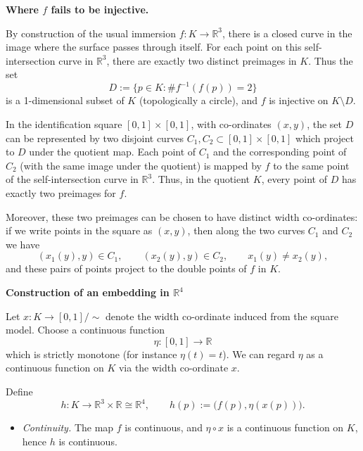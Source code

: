 \begin{solution}
\par\medskip\noindent\textbf{Where $f$ fails to be injective.}\par\smallskip

By construction of the usual immersion $f : K \to \mathbb{R}^3$, there is a
closed curve in the image where the surface passes through itself.  For each
point on this self-intersection curve in $\mathbb{R}^3$, there are exactly two
distinct preimages in $K$.  Thus the set
\[
D := \{ p \in K : \# f^{-1}(f(p)) = 2 \}
\]
is a 1-dimensional subset of $K$ (topologically a circle), and $f$ is injective
on $K \setminus D$.

In the identification square $[0,1]\times[0,1]$, with co-ordinates $(x,y)$,
the set $D$ can be represented by two disjoint curves
$C_1, C_2 \subset [0,1]\times[0,1]$ which project to $D$ under the quotient
map.  Each point of $C_1$ and the corresponding point of $C_2$ (with the same
image under the quotient) is mapped by $f$ to the same point of the
self-intersection curve in $\mathbb{R}^3$.  Thus, in the quotient $K$, every
point of $D$ has exactly two preimages for $f$.

Moreover, these two preimages can be chosen to have distinct width co-ordinates:
if we write points in the square as $(x,y)$, then along the two curves
$C_1$ and $C_2$ we have
\[
(x_1(y),y) \in C_1, \qquad (x_2(y),y) \in C_2, \qquad x_1(y) \neq x_2(y),
\]
and these pairs of points project to the double points of $f$ in $K$.

\par\medskip\noindent\textbf{Construction of an embedding in $\mathbb{R}^{4}$}\par\smallskip


Let $x : K \to [0,1]/\!\sim$ denote the width co-ordinate induced from the square
model.  Choose a continuous function
\[
\eta : [0,1] \longrightarrow \mathbb{R}
\]
which is strictly monotone (for instance $\eta(t) = t$).  We can regard
$\eta$ as a continuous function on $K$ via the width co-ordinate $x$.

Define
\[
h : K \longrightarrow \mathbb{R}^3 \times \mathbb{R} \cong \mathbb{R}^4,
\qquad
h(p) := \bigl(f(p), \eta(x(p))\bigr).
\]


\begin{itemize}
	\item \emph{Continuity.}
	The map $f$ is continuous, and $\eta \circ x$ is a continuous function
	on $K$, hence $h$ is continuous.
	

\end{itemize}
\end{solution}
